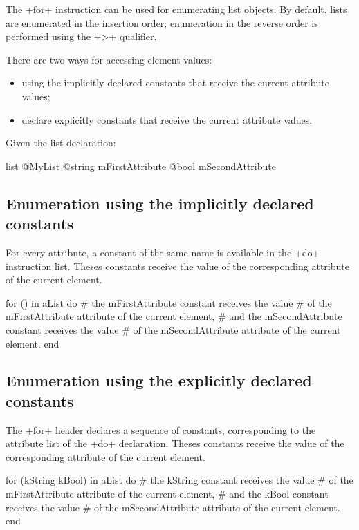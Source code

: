 The \ggs+for+ instruction can be used for enumerating list objects. By default, lists are enumerated in the insertion order; enumeration in the reverse order is performed using the \ggs+>+ qualifier.

There are two ways for accessing element values:
\begin{itemize}
\item using the implicitly declared constants that receive the current attribute values;
\item declare explicitly constants that receive the current attribute values.
\end{itemize}

Given the list declaration:

\begin{galgas}
list @MyList {
  @string mFirstAttribute
  @bool mSecondAttribute
}
\end{galgas}

\subsection{Enumeration using the implicitly declared constants}

For every attribute, a constant of the same name is available in the \ggs+do+ instruction list. Theses constants receive the value of the corresponding attribute of the current element.

\begin{galgas}
for () in aList do
  # the mFirstAttribute constant receives the value
  # of the mFirstAttribute attribute of the current element,
  # and the mSecondAttribute constant receives the value
  # of the mSecondAttribute attribute of the current element.
end
\end{galgas}

\subsection{Enumeration using the explicitly declared constants}

The \ggs+for+ header declares a sequence of constants, corresponding to the attribute list of the \ggs+do+ declaration. Theses constants receive the value of the corresponding attribute of the current element.


\begin{galgas}
for (kString kBool) in aList do
  # the kString constant receives the value
  # of the mFirstAttribute attribute of the current element,
  # and the kBool constant receives the value
  # of the mSecondAttribute attribute of the current element.
end
\end{galgas}

